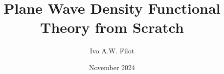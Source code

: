 \documentclass[9pt]{extarticle}
\title{Plane Wave Density Functional Theory from Scratch}
\author{Ivo A.W. Filot}
\date{November 2024}
\begin{document}
\maketitle

\pagestyle{fancy}
\cfoot{}
\cfoot{\thepage}

\begin{multicols*}{2}
    \tableofcontents

    
    
    
    
    
    

    \printbibliography

\end{multicols*}
\end{document}
